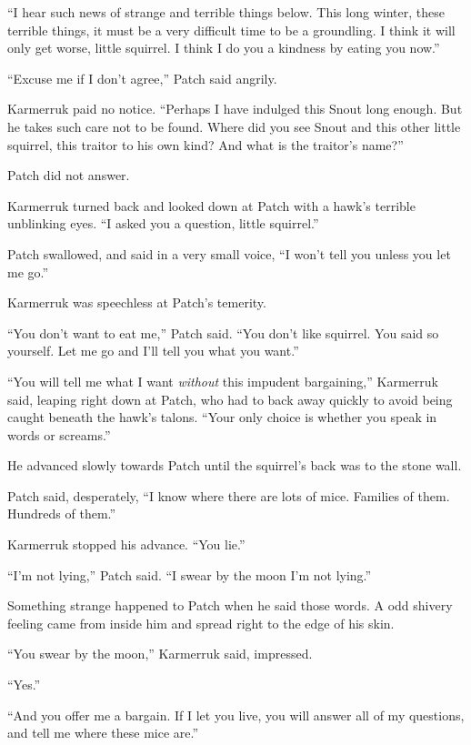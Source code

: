 \documentclass[ebook,oneside,openany,17pt]{memoir}
\newenvironment{tolerant}[1]{%
  \par\tolerance=#1\relax
}{%
  \par
}
\begin{document}
“I hear such news of strange and terrible things below. This long
winter, these terrible things, it must be a very difficult time to be
a groundling. I think it will only get worse, little squirrel. I think
I do you a kindness by eating you now.”

“Excuse me if I don’t agree,” Patch said angrily.

Karmerruk paid no notice. “Perhaps I have indulged this Snout long
enough. But he takes such care not to be found. Where did you see
Snout and this other little squirrel, this traitor to his own kind?
And what is the traitor’s name?”

Patch did not answer.

\begin{tolerant}{2000}
Karmerruk turned back and looked down at Patch with a hawk’s terrible
unblinking eyes. “I asked you a question, little squirrel.”
\end{tolerant}

Patch swallowed, and said in a very small voice, “I won’t tell you
unless you let me go.”

Karmerruk was speechless at Patch’s temerity.

\begin{tolerant}{1000}
“You don’t want to eat me,” Patch said. “You don’t like squirrel. You
said so yourself. Let me go and I’ll tell you what you want.”
\end{tolerant}

“You will tell me what I want \emph{without} this impudent
bargaining,” Karmerruk said, leaping right down at Patch, who had to
back away quickly to avoid being caught beneath the hawk’s
talons. “Your only choice is whether you speak in words or screams.”

He advanced slowly towards Patch until the squirrel’s back was to the
stone wall.

Patch said, desperately, “I know where there are lots of
mice. Families of them. Hundreds of them.”

Karmerruk stopped his advance. “You lie.”

“I’m not lying,” Patch said. “I swear by the moon I’m not lying.”

Something strange happened to Patch when he said those words. A odd
shivery feeling came from inside him and spread right to the edge of
his skin.

“You swear by the moon,” Karmerruk said, impressed.

“Yes.”

“And you offer me a bargain. If I let you live, you will answer all of
my questions, and tell me where these mice are.”
\end{document}
